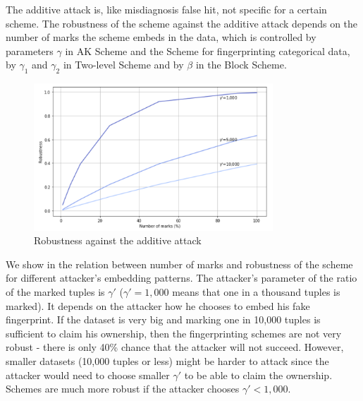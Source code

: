 The additive attack is, like misdiagnosis false hit, not specific for a certain scheme. The robustness of the scheme against the additive attack depends on the number of marks the scheme embeds in the data, which is controlled by parameters $\gamma$ in AK Scheme and the Scheme for fingerprinting categorical data, by $\gamma_1$ and $\gamma_2$ in Two-level Scheme and by $\beta$ in the Block Scheme.
\begin{figure}{
    \centering
    \includegraphics[width=0.8\textwidth]{Figures/additive.PNG}
    \caption{Robustness against the additive attack}
    \label{fig:additive-attack}
}\end{figure}
We show in  the relation between number of marks and robustness of the scheme for different attacker's embedding patterns. 
The attacker's parameter of the ratio of the marked tuples is $\gamma'$ ($\gamma'=1,000$ means that one in a thousand tuples is marked). 
It depends on the attacker how he chooses to embed his fake fingerprint. If the dataset is very big and marking one in 10,000 tuples is sufficient to claim his ownership, then the fingerprinting schemes are not very robust - there is only 40\% chance that the attacker will not succeed. However, smaller datasets (10,000 tuples or less) might be harder to attack since the attacker would need to choose smaller $\gamma'$ to be able to claim the ownership. Schemes are much more robust if the attacker chooses $\gamma'<1,000$.

